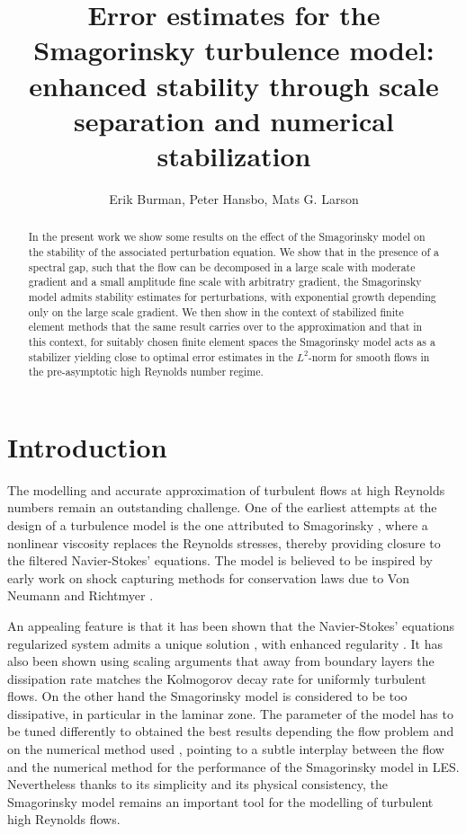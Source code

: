 \documentclass[10pt]{amsart}
\title[Error estimates for the Smagorinsky turbulence model]{Error estimates for the Smagorinsky turbulence model: enhanced stability through
  scale separation and numerical stabilization}
\author{Erik Burman, Peter Hansbo, Mats G. Larson}
\numberwithin{equation}{section}
\theoremstyle{definition}
\theoremstyle{remark}
\renewcommand{\(}{\bigl(}
\renewcommand{\)}{\bigr)}
\begin{document}
\begin{abstract}
In the present work we show some results on
the effect of the Smagorinsky model on the stability of the associated
perturbation equation. We show that in the presence of a spectral gap, such that the
flow can be decomposed in a large scale with moderate gradient
and a small amplitude fine scale with arbitratry gradient, the
Smagorinsky model admits stability estimates for perturbations, with exponential growth
depending only on the large scale gradient. We then show in the
context of stabilized finite element methods that the same result
carries over to the approximation and that in this context, for
suitably chosen finite element spaces the Smagorinsky model acts as a
stabilizer
yielding close to optimal error estimates in the $L^2$-norm for smooth
flows in the pre-asymptotic high
Reynolds number regime. 
\end{abstract}

\maketitle

\section{Introduction}
The modelling and accurate approximation of turbulent flows at high
Reynolds numbers remain an outstanding challenge.
One of the earliest attempts at the design of a turbulence model is the
one attributed to
Smagorinsky \cite{Smag, Smag93}, where a nonlinear viscosity replaces the
Reynolds stresses, thereby providing closure to the filtered
Navier-Stokes' equations. The model is believed to be inspired by early work on shock capturing
methods for conservation laws due to Von Neumann and Richtmyer \cite{VNeu50}. 

An appealing feature is that it has been shown that the Navier-Stokes' equations
regularized system admits a unique solution \cite{Lady68}, with
enhanced regularity \cite{BdV09a, BdV09b}. It has also
been shown using scaling arguments that away from boundary layers the
dissipation rate matches the Kolmogorov decay rate \cite{La16} for
uniformly turbulent flows. On
the other hand the Smagorinsky model is considered to be too
dissipative, in particular in the laminar zone. The parameter of the
model has to
be tuned differently to obtained the best results depending the flow
problem \cite{Ge09} and on the numerical method used \cite{MGS07},
pointing to a subtle interplay between the flow and the numerical
method for the performance of the Smagorinsky model in LES. Nevertheless thanks to its simplicity and its
physical consistency, the Smagorinsky model
remains an important tool for the modelling of turbulent high Reynolds
flows. 
\end{document}
